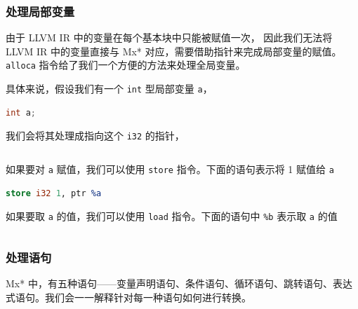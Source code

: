 \subsubsection{处理局部变量}\label{AST-to-IR-local-variables}

由于 LLVM IR 中的变量在每个基本块中只能被赋值一次，
因此我们无法将 LLVM IR 中的变量直接与 Mx* 对应，需要借助指针来完成局部变量的赋值。
\texttt{alloca} 指令给了我们一个方便的方法来处理全局变量。

具体来说，假设我们有一个 \texttt{int} 型局部变量 \texttt{a}，
\begin{lstlisting}[language=C++]
int a;
\end{lstlisting}
我们会将其处理成指向这个 \texttt{i32} 的指针，
\begin{lstlisting}[language=LLVM]
%a = alloca i32
\end{lstlisting}
如果要对 \texttt{a} 赋值，我们可以使用 \texttt{store} 指令。下面的语句表示将 1 赋值给 \texttt{a}
\begin{lstlisting}[language=LLVM]
store i32 1, ptr %a
\end{lstlisting}
如果要取 \texttt{a} 的值，我们可以使用 \texttt{load} 指令。下面的语句中 \texttt{\%b}
表示取 \texttt{a} 的值
\begin{lstlisting}[language=LLVM]
%b = load i32, ptr %5
\end{lstlisting}

\subsubsection{处理语句}\label{AST-to-IR-statements}

Mx* 中，有五种语句——变量声明语句、条件语句、循环语句、跳转语句、表达式语句。我们会一一解释针对每一种语句如何进行转换。

